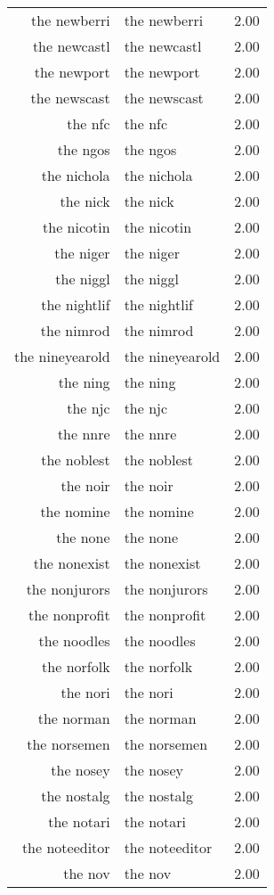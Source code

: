 \begin{table}[ht]
\begin{tabular}{rlr}
  the newberri & the newberri & 2.00 \\ 
  the newcastl & the newcastl & 2.00 \\ 
  the newport & the newport & 2.00 \\ 
  the newscast & the newscast & 2.00 \\ 
  the nfc & the nfc & 2.00 \\ 
  the ngos & the ngos & 2.00 \\ 
  the nichola & the nichola & 2.00 \\ 
  the nick & the nick & 2.00 \\ 
  the nicotin & the nicotin & 2.00 \\ 
  the niger & the niger & 2.00 \\ 
  the niggl & the niggl & 2.00 \\ 
  the nightlif & the nightlif & 2.00 \\ 
  the nimrod & the nimrod & 2.00 \\ 
  the nineyearold & the nineyearold & 2.00 \\ 
  the ning & the ning & 2.00 \\ 
  the njc & the njc & 2.00 \\ 
  the nnre & the nnre & 2.00 \\ 
  the noblest & the noblest & 2.00 \\ 
  the noir & the noir & 2.00 \\ 
  the nomine & the nomine & 2.00 \\ 
  the none & the none & 2.00 \\ 
  the nonexist & the nonexist & 2.00 \\ 
  the nonjurors & the nonjurors & 2.00 \\ 
  the nonprofit & the nonprofit & 2.00 \\ 
  the noodles & the noodles & 2.00 \\ 
  the norfolk & the norfolk & 2.00 \\ 
  the nori & the nori & 2.00 \\ 
  the norman & the norman & 2.00 \\ 
  the norsemen & the norsemen & 2.00 \\ 
  the nosey & the nosey & 2.00 \\ 
  the nostalg & the nostalg & 2.00 \\ 
  the notari & the notari & 2.00 \\ 
  the noteeditor & the noteeditor & 2.00 \\ 
  the nov & the nov & 2.00 \\ 

\end{tabular}
\end{table}
